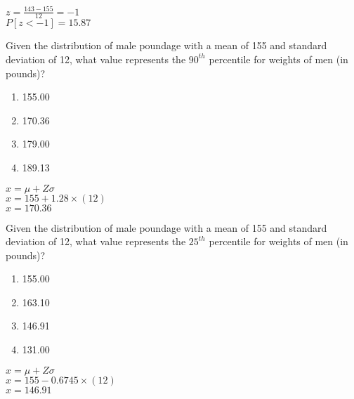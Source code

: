 \documentclass[11pt]{book}\usepackage[]{graphicx}\usepackage[]{color}
\begin{document}
\begin{exercises}
\begin{solution}
	    $z = \frac{143 - 155}{12} = -1$ \\
	    $P[z < -1] = 15.87$

	\end{solution}


  \begin{exercise} %

    Given the distribution of male poundage with a mean of 155 and standard deviation of 12, what value
represents the $90^{th}$ percentile for weights of men (in \\ pounds)?
	  \begin{enumerate}
	   \item 155.00
	  \item 170.36
	  \item 179.00
	  \item 189.13
	  \end{enumerate}
	  \vspace{2mm}
    
	\end{exercise}
	\begin{solution}  %

	    $x = \mu + Z \sigma$ \\
	    $x = 155 + 1.28 \times (12) $ \\
	    $x = 170.36$

  \end{solution}

  \begin{exercise} %

    Given the distribution of male poundage with a mean of 155 and standard deviation of 12, what value
represents the $25^{th}$ percentile for weights of men (in \\ pounds)?
	  \begin{enumerate}
	   \item 155.00
	  \item 163.10
	  \item 146.91
	  \item 131.00
	  \end{enumerate}
	  \vspace{2mm}
    
	\end{exercise}
	\begin{solution}  %

	    $x = \mu + Z \sigma$ \\
	    $x = 155 - 0.6745 \times (12) $ \\
	    $x = 146.91$


\end{solution}
\end{exercises}
\end{document}
